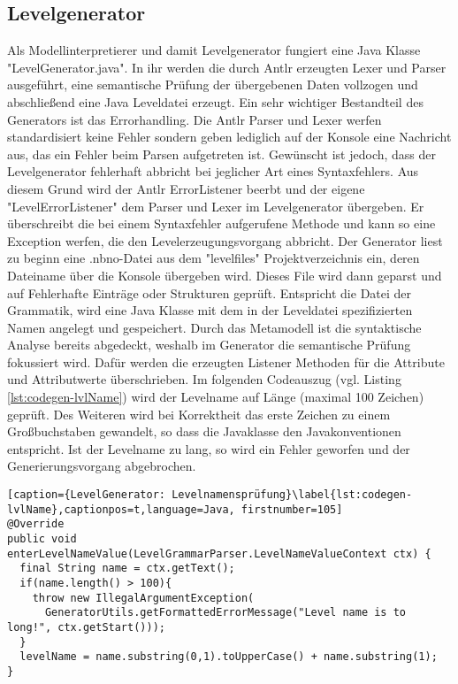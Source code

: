 \subsection{Levelgenerator}

Als Modellinterpretierer und damit Levelgenerator fungiert eine Java Klasse "LevelGenerator.java". In ihr werden die durch Antlr erzeugten Lexer und Parser ausgeführt, eine semantische Prüfung der übergebenen Daten vollzogen und abschließend eine Java Leveldatei erzeugt.\newline
Ein sehr wichtiger Bestandteil des Generators ist das Errorhandling. Die Antlr Parser und Lexer werfen standardisiert keine Fehler sondern geben lediglich auf der Konsole eine Nachricht aus, das ein Fehler beim Parsen aufgetreten ist. Gewünscht ist jedoch, dass der Levelgenerator fehlerhaft abbricht bei jeglicher Art eines Syntaxfehlers. Aus diesem Grund wird der Antlr ErrorListener beerbt und der eigene "LevelErrorListener" dem Parser und Lexer im Levelgenerator übergeben. Er überschreibt die bei einem Syntaxfehler aufgerufene Methode und kann so eine Exception werfen, die den Levelerzeugungsvorgang abbricht.\newline
Der Generator liest zu beginn eine .nbno-Datei aus dem "levelfiles" Projektverzeichnis ein, deren Dateiname über die Konsole übergeben wird. Dieses File wird dann geparst und auf Fehlerhafte Einträge oder Strukturen geprüft. Entspricht die Datei der Grammatik, wird eine Java Klasse mit dem in der Leveldatei spezifizierten Namen angelegt und gespeichert.\newline
Durch das Metamodell ist die syntaktische Analyse bereits abgedeckt, weshalb im Generator die semantische Prüfung fokussiert wird. Dafür werden die erzeugten Listener Methoden für die Attribute und Attributwerte überschrieben. Im folgenden Codeauszug (vgl. Listing \ref{lst:codegen-lvlName}) wird der Levelname auf Länge (maximal 100 Zeichen) geprüft. Des Weiteren wird bei Korrektheit das erste Zeichen zu einem Großbuchstaben gewandelt, so dass die Javaklasse den Javakonventionen entspricht. Ist der Levelname zu lang, so wird ein Fehler geworfen und der Generierungsvorgang abgebrochen.
\begin{minipage}{\linewidth}
\begin{lstlisting}[caption={LevelGenerator: Levelnamensprüfung}\label{lst:codegen-lvlName},captionpos=t,language=Java, firstnumber=105]
@Override
public void enterLevelNameValue(LevelGrammarParser.LevelNameValueContext ctx) {
  final String name = ctx.getText();
  if(name.length() > 100){
    throw new IllegalArgumentException(
      GeneratorUtils.getFormattedErrorMessage("Level name is to long!", ctx.getStart()));
  }
  levelName = name.substring(0,1).toUpperCase() + name.substring(1);
}
\end{lstlisting}
\end{minipage}
